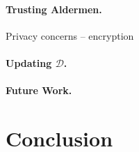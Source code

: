 \documentclass{article}
\begin{document}
\paragraph{Trusting Aldermen.} Privacy concerns -- encryption

\paragraph{Updating $\mathcal{D}$.}

\paragraph{Future Work.}

\section{Conclusion}









  

\end{document}

